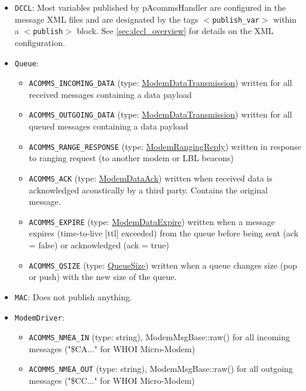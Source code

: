 \documentclass[11pt, letterpaper, oneside]{memoir}
\newcommand{\xmltag}[1]{\texttt{$<$#1$>$}}
\begin{document}
\begin{itemize}
\item \verb|DCCL|: Most variables published by pAcommsHandler are configured in the message XML files and are designated by the tags \xmltag{publish\_var} within a \xmltag{publish} block. See \ref{sec:dccl_overview} for details on the XML configuration. 
\item \verb|Queue|:
\begin{itemize}
\item \verb|ACOMMS_INCOMING_DATA| (type: \href{http://gobysoft.com/doc/modem__message_8proto_source.html}{ModemDataTransmission}) written for all received messages containing a data payload
\item \verb|ACOMMS_OUTGOING_DATA| (type: \href{http://gobysoft.com/doc/modem__message_8proto_source.html}{ModemDataTransmission}) written for all queued messages containing a data payload
\item \verb|ACOMMS_RANGE_RESPONSE| (type: \href{http://gobysoft.com/doc/modem__message_8proto_source.html}{ModemRangingReply}) written in response to ranging request (to another modem or LBL beacons)
\item \verb|ACOMMS_ACK| (type: \href{http://gobysoft.com/doc/modem__message_8proto_source.html}{ModemDataAck}) written when received data is acknowledged acoustically by a third party. Contains the original message.
\item \verb|ACOMMS_EXPIRE| (type: \href{http://gobysoft.com/doc/modem__message_8proto_source.html}{ModemDataExpire}) written when a message expires (time-to-live [ttl] exceeded) from the queue before being sent (ack = false) or acknowledged (ack = true)
\item \verb|ACOMMS_QSIZE| (type: \href{http://gobysoft.com/doc/queue_8proto_source.html}{QueueSize}) written when a queue changes size (pop or push) with the new size of the queue.
\end{itemize}
\item \verb|MAC|: Does not publish anything.
\item \verb|ModemDriver|: 
\begin{itemize}
\item \verb|ACOMMS_NMEA_IN| (type: string), ModemMsgBase::raw() for all incoming messages ("\$CA..." for WHOI Micro-Modem)
\item \verb|ACOMMS_NMEA_OUT| (type: string), ModemMsgBase::raw() for all outgoing messages ("\$CC..." for WHOI Micro-Modem)
\end{itemize}
\end{itemize}
\end{document}
